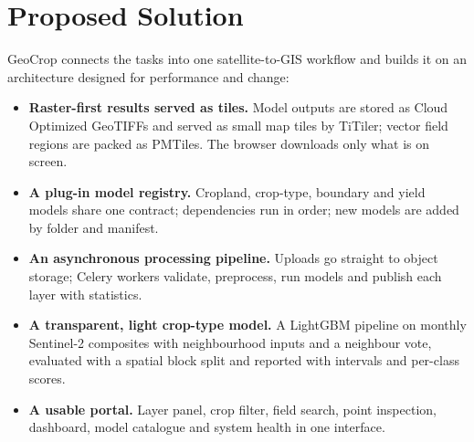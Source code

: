 \section{Proposed Solution}
GeoCrop connects the tasks into one satellite-to-GIS workflow and builds it on an architecture
designed for performance and change:
\begin{itemize}
  \item \textbf{Raster-first results served as tiles.} Model outputs are stored as Cloud Optimized
        GeoTIFFs and served as small map tiles by TiTiler; vector field regions are packed as
        PMTiles. The browser downloads only what is on screen.
  \item \textbf{A plug-in model registry.} Cropland, crop-type, boundary and yield models share one
        contract; dependencies run in order; new models are added by folder and manifest.
  \item \textbf{An asynchronous processing pipeline.} Uploads go straight to object storage; Celery
        workers validate, preprocess, run models and publish each layer with statistics.
  \item \textbf{A transparent, light crop-type model.} A LightGBM pipeline on monthly Sentinel-2
        composites with neighbourhood inputs and a neighbour vote, evaluated with a spatial block
        split and reported with intervals and per-class scores.
  \item \textbf{A usable portal.} Layer panel, crop filter, field search, point inspection,
        dashboard, model catalogue and system health in one interface.
\end{itemize}

